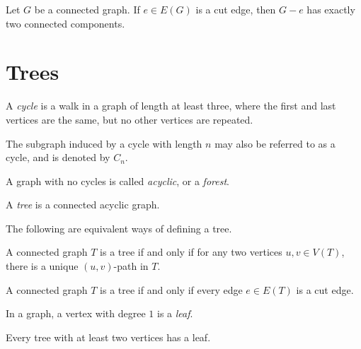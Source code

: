 \begin{thm}
    Let $G$ be a connected graph. If $e \in E(G)$ is a cut edge, then $G - e$ has exactly two connected components.
\end{thm}

\section{Trees}

\begin{defn}
    A \emph{cycle} is a walk in a graph of length at least three, where the first and last vertices are the same, but no other vertices are repeated.
\end{defn}

\begin{rmk}
    The subgraph induced by a cycle with length $n$ may also be referred to as a cycle, and is denoted by $C_n$.
\end{rmk}

\begin{defn}
    A graph with no cycles is called \emph{acyclic}, or a \emph{forest}.
\end{defn}

\begin{defn}
    A \emph{tree} is a connected acyclic graph.
\end{defn}

\begin{rmk}
    The following are equivalent ways of defining a tree.
\end{rmk}

\begin{thm}\label{tree-unique-path}
    A connected graph $T$ is a tree if and only if for any two vertices $u, v \in V(T)$, there is a unique $(u, v)$-path in $T$.
\end{thm}

\begin{thm}\label{tree-cute-edges}
    A connected graph $T$ is a tree if and only if every edge $e \in E(T)$ is a cut edge.
\end{thm}

\begin{defn}
    In a graph, a vertex with degree $1$ is a \emph{leaf}.
\end{defn}

\begin{thm}\label{tree-has-leaf}
    Every tree with at least two vertices has a leaf.
\end{thm}


